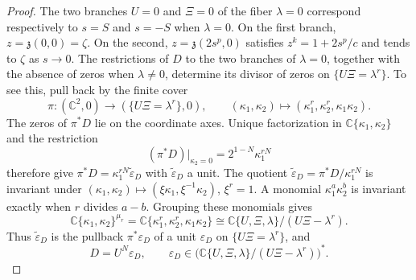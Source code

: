 \documentclass[11pt,letterpaper]{article}
\numberwithin{equation}{section}
\theoremstyle{remark}
\theoremstyle{plain}
\newcommand{\C}{\mathbb{C}}
\begin{document}
\begin{proof}
The two branches $U=0$ and $\Xi=0$ of the fiber $\lambda=0$
correspond respectively to $s=S$ and $s=-S$ when $\lambda=0$.
On the first branch, $z=\mathfrak z(0,0)=\zeta$.  On the second,
$z=\mathfrak z(2s^p,0)$ satisfies $z^k=1+2s^p/c$ and tends to
$\zeta$ as $s\to0$.
The restrictions of $D$ to the two branches of $\lambda=0$,
together with the absence of zeros when $\lambda\neq0$, determine
its divisor of zeros on $\{U\Xi=\lambda^r\}$.  To see this, pull back by
the finite cover
\[
 \pi:(\C^2,0)\longrightarrow(\{U\Xi=\lambda^r\},0),\qquad
 (\kappa_1,\kappa_2)\longmapsto
 (\kappa_1^r,\kappa_2^r,\kappa_1\kappa_2).
\]
The zeros of $\pi^*D$ lie on the coordinate axes.
Unique factorization in $\C\{\kappa_1,\kappa_2\}$
\cite[Theorem~I.1.16]{GreuelLossenShustin}
and the restriction
\[
 (\pi^*D)|_{\kappa_2=0}=2^{1-N}\kappa_1^{rN}
\]
therefore give $\pi^*D=\kappa_1^{rN}\widetilde\varepsilon_D$
with $\widetilde\varepsilon_D$ a unit.
The quotient $\widetilde\varepsilon_D=\pi^*D/\kappa_1^{rN}$
is invariant under
$(\kappa_1,\kappa_2)\mapsto(\xi\kappa_1,\xi^{-1}\kappa_2)$,
$\xi^r=1$.  A monomial $\kappa_1^a\kappa_2^b$ is invariant exactly
when $r$ divides $a-b$.  Grouping these monomials gives
\[
 \C\{\kappa_1,\kappa_2\}^{\mu_r}
 =\C\{\kappa_1^r,\kappa_2^r,\kappa_1\kappa_2\}
 \cong\C\{U,\Xi,\lambda\}/(U\Xi-\lambda^r).
\]
Thus $\widetilde\varepsilon_D$ is the pullback $\pi^*\varepsilon_D$
of a unit $\varepsilon_D$ on $\{U\Xi=\lambda^r\}$, and
\begin{equation}
 D=U^N\varepsilon_D,
 \qquad \varepsilon_D\in
 \bigl(\C\{U,\Xi,\lambda\}/(U\Xi-\lambda^r)\bigr)^*.             \label{eq:d2-cyc-hyp-descent}
\end{equation}


\end{proof}
\end{document}
